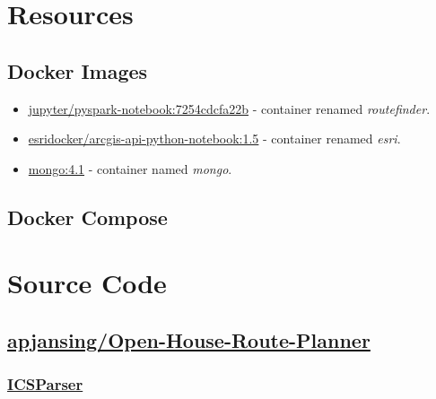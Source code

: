 \chapter{Resources}
\section{Docker Images}\label{docker-images}
\begin{itemize}
  \item \href{https://hub.docker.com/r/jupyter/pyspark-notebook}{jupyter/pyspark-notebook:7254cdcfa22b}\cite{img-pyspark} - container renamed \emph{routefinder}.
  \item \href{https://hub.docker.com/r/esridocker/arcgis-api-python-notebook}{esridocker/arcgis-api-python-notebook:1.5}\cite{img-esri} - container renamed \emph{esri}.
  \item \href{https://hub.docker.com/_/mongo}{mongo:4.1}\cite{img-mongo} - container named \emph{mongo}.
\end{itemize}


\section{Docker Compose}



\chapter{Source Code}\label{code}
\section{\href{https://github.com/apjansing/Open-House-Route-Planner}{apjansing/Open-House-Route-Planner}}

\subsection{\href{https://github.com/apjansing/Open-House-Route-Planner/blob/master/backend/docker/persistence/pyspark/ICSParser.py}{ICSParser}} \label{ICSParser}

